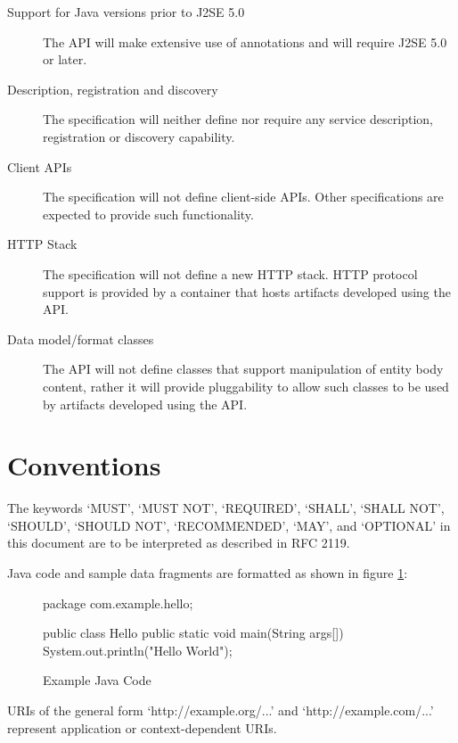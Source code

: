 \begin{description}

\item[Support for Java versions prior to J2SE 5.0] The API will make extensive use of annotations and will require J2SE 5.0 or later.

\item[Description, registration and discovery] The specification will neither define nor require any service description, registration or discovery capability.

\item[Client APIs] The specification will not define client-side APIs. Other specifications are expected to provide such functionality.

\item[HTTP Stack] The specification will not define a new HTTP stack. HTTP protocol support is provided by a container that hosts artifacts developed using the API.

\item[Data model/format classes] The API will not define classes that support manipulation of entity body content, rather it will provide pluggability to allow such classes to be used by artifacts developed using the API.

\end{description}

\section{Conventions}

The keywords `MUST', `MUST NOT', `REQUIRED', `SHALL', `SHALL NOT', `SHOULD', `SHOULD NOT', `RECOMMENDED', `MAY', and `OPTIONAL' in this document are to be interpreted as described in RFC 2119\cite{rfc2119}. 

Java code and sample data fragments are formatted as shown in figure \ref{ex1}:

\begin{figure}[hbtp]
\caption{Example Java Code}
\label{ex1}
\begin{listing}{1}
package com.example.hello;

public class Hello {
    public static void main(String args[]) {
        System.out.println("Hello World");
    }
}\end{listing}
\end{figure}

URIs of the general form `http://example.org/...' and `http://example.com/...' represent application or context-dependent URIs.


